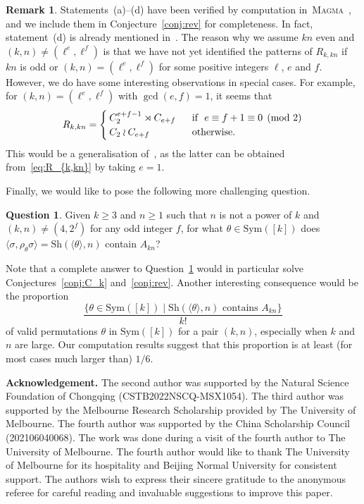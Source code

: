 \documentclass[11pt,a4paper,reqno]{amsart}
\newcommand{\A}{A}
\newcommand{\Sym}{\mathrm{Sym}}
\newcommand{\Sh}{\mathrm{Sh}}
\theoremstyle{definition}
\newtheorem{question}[theorem]{Question}
\newtheorem*{remark}{Remark}
\begin{document}
\begin{remark}
Statements~(a)--(d) have been verified by computation in~\textsc{Magma}~\cite{Magma}, and we include them in Conjecture~\ref{conj:rev} for completeness. In fact, statement~(d) is already mentioned in~\cite{MM1987}. The reason why we assume $kn$ even and $(k,n)\neq (\ell^e,\ell^f)$ is that we have not yet identified the patterns of $R_{k,kn}$ if $kn$ is odd or $(k,n)= (\ell^e,\ell^f)$ for some positive integers $\ell$, $e$ and $f$. However, we do have some interesting observations in special cases. For example, for $(k,n)=(\ell^e,\ell^f)$ with $\gcd(e,f)=1$, it seems that
\begin{equation}\label{eq:R_{k,kn}}
  R_{k,kn}=\begin{cases}
    C_2^{e+f-1}\rtimes C_{e+f}&\ \text{ if }\  e\equiv f+1\equiv 0\pmod{2}\\
    C_2\wr C_{e+f}&\ \text{ otherwise}.
  \end{cases}
\end{equation}
  This would be a generalisation of~\cite[Theorem~1.4(1)]{AMP2021}, as the latter can be obtained from~\eqref{eq:R_{k,kn}} by taking $e=1$.
\end{remark}

Finally, we would like to pose the following more challenging question.
\begin{question}\label{ques}
Given $k\geq 3$ and $n\geq 1$ such that $n$ is not a power of $k$ and $(k,n)\neq(4,2^f)$ for any odd integer $f$, for what $\theta\in\Sym([k])$ does $\langle\sigma,\rho_{\theta}\sigma\rangle=\Sh(\langle\theta\rangle,n)$ contain $\A_{kn}$?
\end{question}
Note that a complete answer to Question~\ref{ques} would in particular solve Conjectures~\ref{conj:C_k} and~\ref{conj:rev}. Another interesting consequence would be the proportion
\[
  \frac{\{\theta\in \Sym([k])\mid \Sh(\langle\theta\rangle,n) \text{ contains } \A_{kn}\}}{k!}
\]
of valid permutations $\theta$ in $\Sym([k])$ for a pair $(k,n)$, especially when $k$ and $n$ are large. Our computation results suggest that this proportion is at least (for most cases much larger than) $1/6$.


\vspace{15pt}
\noindent\textbf{Acknowledgement.}
The second author was supported by the Natural Science Foundation of Chongqing (CSTB2022NSCQ-MSX1054). The third author was supported by the Melbourne Research Scholarship provided by The University of Melbourne. The fourth author was supported by the China Scholarship Council (202106040068). The work was done during a visit of the fourth author to The University of Melbourne. The fourth author would like to thank The University of Melbourne for its hospitality and Beijing Normal University for consistent support. The authors wish to express their sincere gratitude to the anonymous referee for careful reading and invaluable suggestions to improve this paper.
\end{document}
